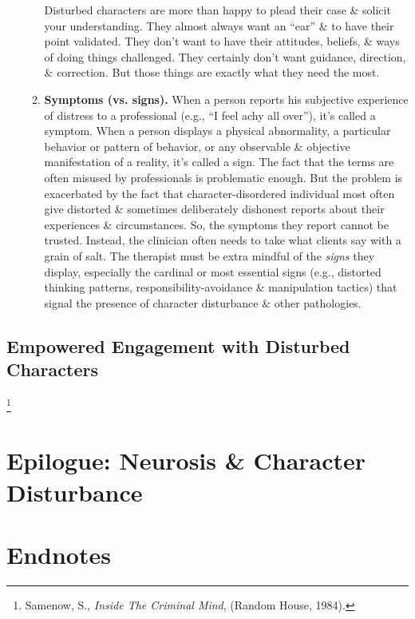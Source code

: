 \documentclass{article}
\numberwithin{equation}{section}
\begin{document}
\begin{itemize}
\begin{enumerate}
		Disturbed characters are more than happy to plead their case \& solicit your understanding. They almost always want an ``ear'' \& to have their point validated. They don't want to have their attitudes, beliefs, \& ways of doing things challenged. They certainly don't want guidance, direction, \& correction. But those things are exactly what they need the most.
		\item \textbf{Symptoms (vs. signs).} When a person reports his subjective experience of distress to a professional (e.g., ``I feel achy all over''), it's called a symptom. When a person displays a physical abnormality, a particular behavior or pattern of behavior, or any observable \& objective manifestation of a reality, it's called a sign. The fact that the terms are often misused by professionals is problematic enough. But the problem is exacerbated by the fact that character-disordered individual most often give distorted \& sometimes deliberately dishonest reports about their experiences \& circumstances. So, the symptoms they report cannot be trusted. Instead, the clinician often needs to take what clients say with a grain of salt. The therapist must be extra mindful of the \textit{signs} they display, especially the cardinal or most essential signs (e.g., distorted thinking patterns, responsibility-avoidance \& manipulation tactics) that signal the presence of character disturbance \& other pathologies.
	\end{enumerate}
\end{itemize}

\subsection{Empowered Engagement with Disturbed Characters}

\footnote{Samenow, S., {\it Inside The Criminal Mind}, (Random House, 1984).}


\section{Epilogue: Neurosis \& Character Disturbance}


\section*{Endnotes}


\printbibliography[heading=bibintoc]
	
\end{document}
